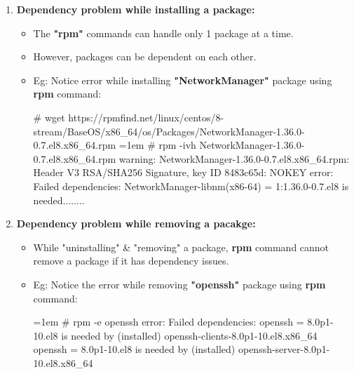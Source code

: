 \setlength{\columnsep}{3pt}
\begin{flushleft}
	\begin{enumerate}
		\item \textbf{Dependency problem while installing a package:}
		\begin{itemize}
			\item The \textbf{"rpm"} commands can handle only 1 package at a time.
			\item However, packages can be dependent on each other.
			\item Eg: Notice error while installing \textbf{"NetworkManager"} package using \textbf{rpm} command:
			\begin{tcolorbox}[breakable,notitle,boxrule=-0pt,colback=black,colframe=black]
				\color{green}
				\# wget https://rpmfind.net/linux/centos/8-stream/BaseOS/x86\_64/os/Packages/NetworkManager-1.36.0-0.7.el8.x86\_64.rpm
				\font=1em
				\newline
				\# rpm -ivh NetworkManager-1.36.0-0.7.el8.x86\_64.rpm
				\color{red}\newline
				warning: NetworkManager-1.36.0-0.7.el8.x86\_64.rpm: Header V3 RSA/SHA256 Signature, key ID 8483c65d: NOKEY
				\newline
				error: Failed dependencies:
				\newline
				NetworkManager-libnm(x86-64) = 1:1.36.0-0.7.el8 is needed........
				\font=4pt
			\end{tcolorbox}
			\end{itemize}

			\item \textbf{Dependency problem while removing a pacakge:}
			\begin{itemize}
				\item While "uninstalling" \& "removing" a package, \textbf{rpm} command cannot remove a package if it has dependency issues.
				\item Eg: Notice the error while removing \textbf{"openssh"} package using \textbf{rpm} command:
				\bigskip
				\begin{tcolorbox}[breakable,notitle,boxrule=-0pt,colback=black,colframe=black]
					\color{green}
					\font=1em
					\# rpm -e openssh
					\color{red}
					\newline
					error: Failed dependencies:
					\newline
					openssh = 8.0p1-10.el8 is needed by (installed) openssh-clients-8.0p1-10.el8.x86\_64
					\newline
					openssh = 8.0p1-10.el8 is needed by (installed) openssh-server-8.0p1-10.el8.x86\_64
					\font=4pt
				\end{tcolorbox}				
			\end{itemize}

	\end{enumerate}

\end{flushleft}
\newpage


